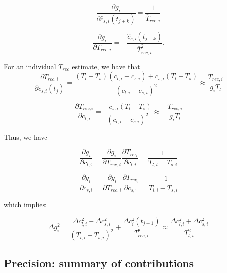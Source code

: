 \begin{equation}
\frac{\partial g_{i}}{\partial \hat{c}_{s,i}(t_{j+k})} = \frac{1}{\overline{T}_{rec,i}}
\end{equation}

\begin{equation}
\frac{\partial g_{i}}{\partial T_{rec,i}} = - \frac{\hat{c}_{s,i}(t_{j+k})}{\overline{T}_{rec,i}^2}.
\end{equation}

For an individual \(T_{rec}\) estimate, we have that
\begin{equation}
 \frac{\partial T_{rec,i}}{\partial c_{s,i}(t_{j})} = \frac{(T_{l}-T_{s})(c_{l,i}-c_{s,i}) + c_{s,i}(T_{l}-T_{s})}
{(c_{l,i}-c_{s,i})^2} \approx \frac{T_{rec,i}}{g_{i}T_{l}}
\end{equation}

\begin{equation}
 \frac{\partial T_{rec,i}}{\partial c_{l,i}} = \frac{-c_{s,i}(T_{l}-T_{s})}{(c_{l,i}-c_{s,i})^2} \approx -\frac{T_{rec,i}}{g_{i}T_{l}}
\end{equation}

Thus, we have

\begin{equation}
 \frac{\partial g_{i}}{\partial c_{l,i}} = \frac{\partial g_{i}}{\partial T_{rec,i}}\frac{\partial T_{rec_{i}}}{\partial c_{l,i}}=
\frac{1}{T_{l,i}-T_{s,i}} 
\end{equation}

\begin{equation}
 \frac{\partial g_{i}}{\partial c_{s,i}} = \frac{\partial g_{i}}{\partial T_{rec,i}}\frac{\partial T_{rec_{i}}}{\partial c_{s,i}} =
\frac{-1}{T_{l,i}-T_{s,i}} 
\end{equation}

which implies:

\begin{equation}
\Delta g_{i}^{2} =  \frac{\Delta c_{l,i}^{2} + \Delta c_{s,i}^{2}}{(T_{l,i}-T_{s,i})^2} + \frac{ \Delta c_{i}^{2}(t_{j+1})}{T_{rec,i}^{2}}
\approx \frac{\Delta c_{l,i}^{2} + \Delta c_{s,i}^{2}}{T_{l,i}^2}
\end{equation}
 

\subsection*{Precision: summary of contributions}

